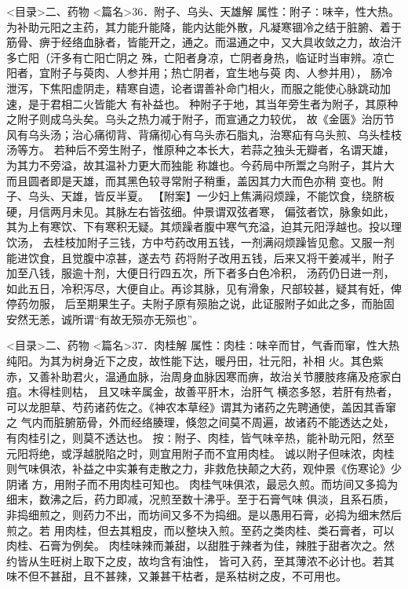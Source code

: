 \documentclass[a4paper,12pt,UTF8,twoside]{ctexbook}
\begin{document}
<目录>二、药物
<篇名>36．附子、乌头、天雄解
属性：附子∶味辛，性大热。为补助元阳之主药，其力能升能降，能内达能外散，凡凝寒锢冷之结于脏腑、着于 
筋骨、痹于经络血脉者，皆能开之，通之。而温通之中，又大具收敛之力，故治汗多亡阳（汗多有亡阳亡阴之 
殊，亡阳者身凉，亡阴者身热，临证时当审辨。凉亡阳者，宜附子与萸肉、人参并用；热亡阴者，宜生地与萸 
肉、人参并用）， 
肠冷泄泻，下焦阳虚阴走，精寒自遗，论者谓善补命门相火，而服之能使心脉跳动加速，是于君相二火皆能大 
有补益也。 
种附子于地，其当年旁生者为附子，其原种之附子则成乌头矣。乌头之热力减于附子，而宣通之力较优， 
故《金匮》治历节风有乌头汤；治心痛彻背、背痛彻心有乌头赤石脂丸，治寒疝有乌头煎、乌头桂枝汤等方。 
若种后不旁生附子，惟原种之本长大，若蒜之独头无瓣者，名谓天雄，为其力不旁溢，故其温补力更大而独能 
称雄也。今药局中所鬻之乌附子，其片大而且圆者即是天雄，而其黑色较寻常附子稍重，盖因其力大而色亦稍 
变也。附子、乌头、天雄，皆反半夏。 
【附案】一少妇上焦满闷烦躁，不能饮食，绕脐板硬，月信两月未见。其脉左右皆弦细。仲景谓双弦者寒， 
偏弦者饮，脉象如此，其为上有寒饮、下有寒积无疑。其烦躁者腹中寒气充溢，迫其元阳浮越也。投以理饮汤， 
去桂枝加附子三钱，方中芍药改用五钱，一剂满闷烦躁皆见愈。又服一剂能进饮食，且觉腹中凉甚，遂去芍 
药将附子改用五钱，后来又将干姜减半，附子加至八钱，服逾十剂，大便日行四五次，所下者多白色冷积， 
汤药仍日进一剂，如此五日，冷积泻尽，大便自止。再诊其脉，见有滑象，尺部较甚，疑其有妊，俾停药勿服， 
后至期果生子。夫附子原有殒胎之说，此证服附子如此之多，而胎固安然无恙，诚所谓“有故无殒亦无殒也”。 

<目录>二、药物
<篇名>37．肉桂解
属性：肉桂∶味辛而甘，气香而窜，性大热纯阳。为其为树身近下之皮，故性能下达，暖丹田，壮元阳，补相 
火。其色紫赤，又善补助君火，温通血脉，治周身血脉因寒而痹，故治关节腰肢疼痛及疮家白疽。木得桂则枯， 
且又味辛属金，故善平肝木，治肝气 
横恣多怒，若肝有热者，可以龙胆草、芍药诸药佐之。《神农本草经》谓其为诸药之先聘通使，盖因其香窜之 
气内而脏腑筋骨，外而经络腠理，倏忽之间莫不周遍，故诸药不能透达之处，有肉桂引之，则莫不透达也。 
按∶附子、肉桂，皆气味辛热，能补助元阳，然至元阳将绝，或浮越脱陷之时，则宜用附子而不宜用肉桂。 
诚以附子但味浓，肉桂则气味俱浓，补益之中实兼有走散之力，非救危抉颠之大药，观仲景《伤寒论》少阴诸 
方，用附子而不用肉桂可知也。 
肉桂气味俱浓，最忌久煎。而坊间又多捣为细末，数沸之后，药力即减，况煎至数十沸乎。至于石膏气味 
俱淡，且系石质，非捣细煎之，则药力不出，而坊间又多不为捣细。是以愚用石膏，必捣为细末然后煎之。若 
用肉桂，但去其粗皮，而以整块入煎。至药之类肉桂、类石膏者，可以肉桂、石膏为例矣。 
肉桂味辣而兼甜，以甜胜于辣者为佳，辣胜于甜者次之。然约皆从生旺树上取下之皮，故均含有油性， 
皆可入药，至其薄浓不必计也。若其味不但不甚甜，且不甚辣，又兼甚干枯者，是系枯树之皮，不可用也。 
\end{document}
